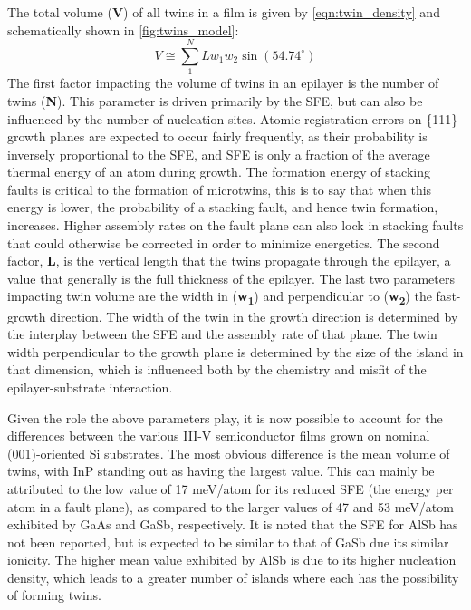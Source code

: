 The total volume (\textbf{V}) of all twins in a film is given by \cref{eqn:twin_density} and schematically shown in \cref{fig:twins_model}:
\begin{equation}\label{eqn:twin_density}
V \cong \sum\limits_{1}^{N} L w_1 w_2 \sin(54.74^{\circ})
\end{equation}
The first factor impacting the volume of twins in an epilayer is the number of twins (\textbf{N}). This parameter is driven primarily by the SFE, but can also be influenced by the number of nucleation sites. Atomic registration errors on \{111\} growth planes are expected to occur fairly frequently, as their probability is inversely proportional to the SFE, and SFE is only a fraction of the average thermal energy of an atom during growth\cite{Ernst1989}. The formation energy of stacking faults is critical to the formation of microtwins, this is to say that when this energy is lower, the probability of a stacking fault, and hence twin formation, increases\cite{Oda2007}. Higher assembly rates on the fault plane can also lock in stacking faults that could otherwise be corrected in order to minimize energetics. The second factor, \textbf{L}, is the vertical length that the twins propagate through the epilayer, a value that generally is the full thickness of the epilayer. The last two parameters impacting twin volume are the width in (\textbf{w\textsubscript{1}}) and perpendicular to (\textbf{w\textsubscript{2}}) the fast-growth direction. The width of the twin in the growth direction is determined by the interplay between the SFE and the assembly rate of that plane. The twin width perpendicular to the growth plane is determined by the size of the island in that dimension, which is influenced both by the chemistry and misfit of the epilayer-substrate interaction.

Given the role the above parameters play, it is now possible to account for the differences between the various III-V semiconductor films grown on nominal (001)-oriented Si substrates. The most obvious difference is the mean volume of twins, with InP standing out as having the largest value. This can mainly be attributed to the low value of 17 meV/atom for its reduced SFE (the energy per atom in a fault plane)\cite{Gottschalk1978}, as compared to the larger values of 47 and 53 meV/atom exhibited by GaAs and GaSb, respectively\cite{Gottschalk1978}. It is noted that the SFE for AlSb has not been reported, but is expected to be similar to that of GaSb due its similar ionicity\cite{Holt2007b}. The higher mean value exhibited by AlSb is due to its higher nucleation density\cite{Akahane2004}, which leads to a greater number of islands where each has the possibility of forming twins.


